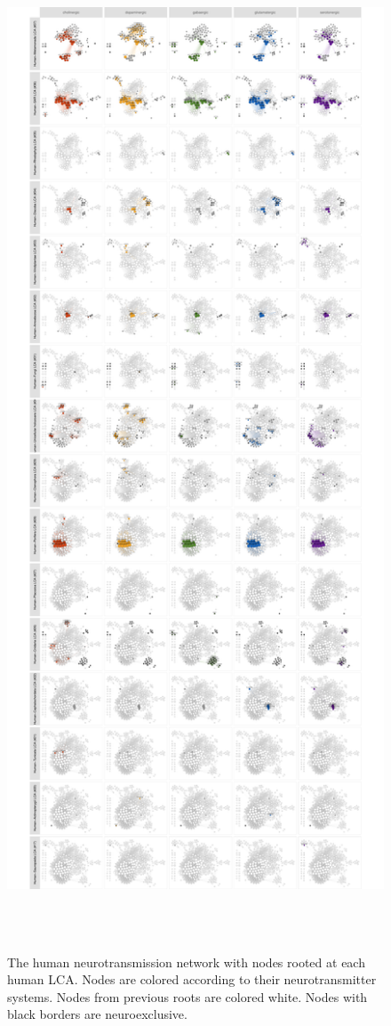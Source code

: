 \pdfpagewidth=16.6in \pdfpageheight=37.6in

\begin{figure}[p]


\caption{The human neurotransmission network with nodes rooted at each human LCA. Nodes are colored according to their neurotransmitter systems. Nodes from previous roots are colored white. Nodes with black borders are neuroexclusive.}\label{fig:analysis.network.faceted_systems-1}

\restoregeometry

{\centering \includegraphics[height=35in, width=15in]{figs/analysis.network.faceted_systems-1} }


\end{figure}
